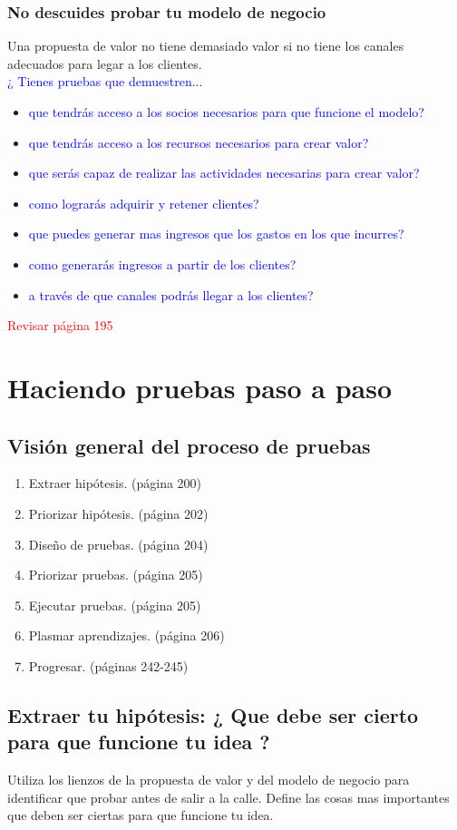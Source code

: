 \documentclass[11pt]{book}
\begin{document}
\subsubsection{No descuides probar tu modelo de negocio}
Una propuesta de valor no tiene demasiado valor si no tiene los canales adecuados para legar a los clientes.\\
\textcolor{blue}{¿ Tienes pruebas que demuestren...}
\begin{itemize}
\item \textcolor{blue}{ que tendrás acceso a los socios necesarios para que funcione el modelo?}
\item \textcolor{blue}{ que tendrás acceso a los recursos necesarios para crear valor? }
\item \textcolor{blue}{ que serás capaz de realizar las actividades necesarias para crear valor? }
\item \textcolor{blue}{ como lograrás adquirir y retener clientes? }
\item \textcolor{blue}{ que puedes generar mas ingresos que los gastos en los que incurres? }
\item \textcolor{blue}{ como generarás ingresos a partir de los clientes? }
\item \textcolor{blue}{ a través de que canales podrás llegar a los clientes? }
\end{itemize}
\textcolor{red}{Revisar página 195}
\section{Haciendo pruebas paso a paso}
\subsection{Visión general del proceso de pruebas}
\begin{enumerate}
\item Extraer hipótesis. (página 200)
\item Priorizar hipótesis. (página 202)
\item Diseño de pruebas. (página 204)
\item Priorizar pruebas. (página 205)
\item Ejecutar pruebas. (página 205)
\item Plasmar aprendizajes. (página 206)
\item Progresar. (páginas 242-245)
\end{enumerate}
\subsection{Extraer tu hipótesis: ¿ Que debe ser cierto para que funcione tu idea ?}
Utiliza los lienzos de la propuesta de valor y del modelo de negocio para identificar que probar antes de salir a la calle. Define las cosas mas importantes que deben ser ciertas para que funcione tu idea.
\end{document}
